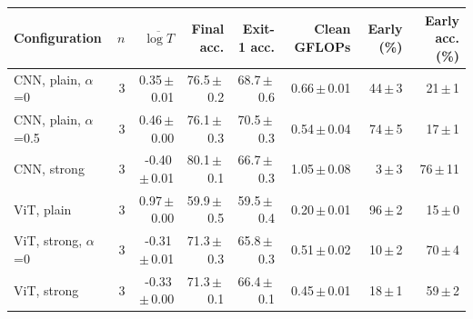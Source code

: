 \begin{tabular}{lrrrrrrr}
\toprule
Configuration & $n$ & $\overline{\log T}$ & Final acc. & Exit-1 acc. & Clean GFLOPs & Early (\%) & Early acc. (\%) \\
\midrule
CNN, plain, $\alpha$=0 & 3 & 0.35\,$\pm$\,0.01 & 76.5\,$\pm$\,0.2 & 68.7\,$\pm$\,0.6 & 0.66\,$\pm$\,0.01 & 44\,$\pm$\,3 & 21\,$\pm$\,1 \\
CNN, plain, $\alpha$=0.5 & 3 & 0.46\,$\pm$\,0.00 & 76.1\,$\pm$\,0.3 & 70.5\,$\pm$\,0.3 & 0.54\,$\pm$\,0.04 & 74\,$\pm$\,5 & 17\,$\pm$\,1 \\
CNN, strong & 3 & -0.40\,$\pm$\,0.01 & 80.1\,$\pm$\,0.1 & 66.7\,$\pm$\,0.3 & 1.05\,$\pm$\,0.08 & 3\,$\pm$\,3 & 76\,$\pm$\,11 \\
ViT, plain & 3 & 0.97\,$\pm$\,0.00 & 59.9\,$\pm$\,0.5 & 59.5\,$\pm$\,0.4 & 0.20\,$\pm$\,0.01 & 96\,$\pm$\,2 & 15\,$\pm$\,0 \\
ViT, strong, $\alpha$=0 & 3 & -0.31\,$\pm$\,0.01 & 71.3\,$\pm$\,0.3 & 65.8\,$\pm$\,0.3 & 0.51\,$\pm$\,0.02 & 10\,$\pm$\,2 & 70\,$\pm$\,4 \\
ViT, strong & 3 & -0.33\,$\pm$\,0.00 & 71.3\,$\pm$\,0.1 & 66.4\,$\pm$\,0.1 & 0.45\,$\pm$\,0.01 & 18\,$\pm$\,1 & 59\,$\pm$\,2 \\
\bottomrule
\end{tabular}
